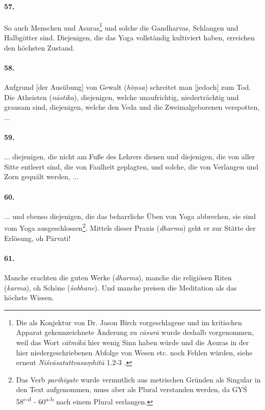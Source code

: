 \documentclass[a4paper,12pt]{article}
\begin{document}
\paragraph{57.} So auch Menschen und Asuras\footnote{Die als Konjektur von Dr. Jason Birch vorgeschlagene und im kritischen Apparat gekennzeichnete Änderung zu \textit{cāsurā} wurde deshalb vorgenommen, weil das Wort \textit{cātmikā} hier wenig Sinn haben würde und die Asuras in der hier niedergeschriebenen Abfolge von Wesen etc. noch Fehlen würden, siehe erneut \textit{Niśvāsatattvasaṃhitā} 1.2-3 \parencite[137]{nishvasa2015}.}  und solche die Gandharvas, Schlangen und Halbgötter sind. Diejenigen, die das Yoga vollständig kultiviert haben, erreichen den höchsten Zustand.

\paragraph{58.} Aufgrund [der Ausübung] von Gewalt (\textit{hiṃsa}) schreitet man [jedoch] zum Tod. Die Atheisten (\textit{nāstika}), diejenigen, welche unaufrichtig, niederträchtig und grausam sind, diejenigen, welche den Veda und die Zweimalgeborenen verspotten, ...

\paragraph{59.} ... diejenigen, die nicht am Fuße des Lehrers dienen und diejenigen, die von aller Sitte entleert sind, die von Faulheit geplagten, und solche, die von Verlangen und Zorn gequält werden, ...

\paragraph{60.} ... und ebenso diejenigen, die das beharrliche Üben von Yoga abbrechen, sie sind vom Yoga ausgeschlossen\footnote{Das Verb \textit{parihīyate} wurde vermutlich aus metrischen Gründen als Singular in den Text aufgenommen, muss aber als Plural verstanden werden, da GYŚ 58\textsuperscript{c-d} - 60\textsuperscript{a-b} nach einem Plural verlangen.}. Mittels dieser Praxis (\textit{dharma}) geht er zur Stätte der Erlösung, oh Pārvati!

\paragraph{61.} Manche erachten die guten Werke (\textit{dharma}), manche die religiösen Riten (\textit{karma}), oh Schöne (\textit{śobhane}). Und manche preisen die Meditation als das höchste Wissen.
\end{document}
